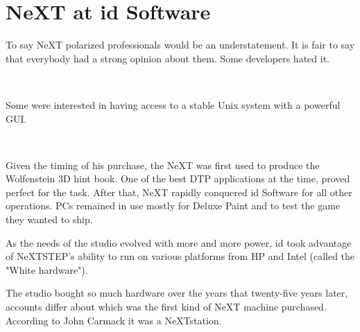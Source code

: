 \section{NeXT at id Software}
To say NeXT polarized professionals would be an understatement. It is fair to say that everybody had a strong opinion about them. Some developers hated it.\\
\par
{}\\
\par
Some were interested in having access to a stable Unix system with a powerful GUI.\\
\par
{}
\\
\par
Given the timing of his purchase, the NeXT was first used to produce the Wolfenstein 3D hint book. One of the best DTP applications at the time,  proved perfect for the task. After that, NeXT rapidly conquered id Software for all other operations. PCs remained in use mostly for Deluxe Paint and to test the game they wanted to ship.\\
\par
As the needs of the studio evolved with more and more power, id took advantage of NeXTSTEP's ability to run on various platforms from HP and Intel (called the "White hardware").






The studio bought so much hardware over the years that twenty-five years later, accounts differ about which was the first kind of NeXT machine purchased. According to John Carmack it was a NeXTstation.\\
\par
\vspace{2mm}

